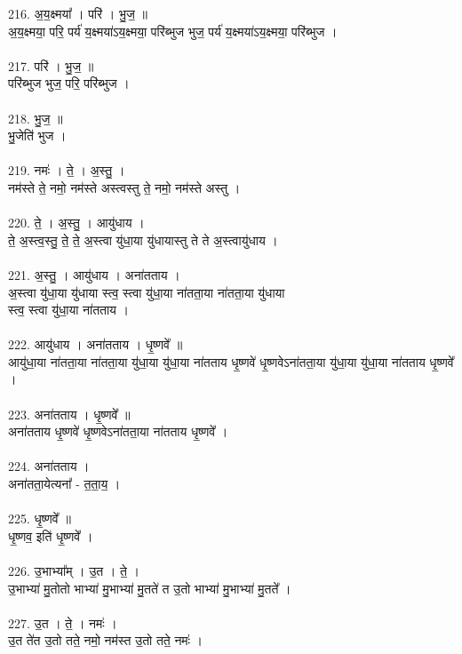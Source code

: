 216. अ॒य॒क्ष्मया᳚ । परि॑ । भु॒ज॒ ॥\\
अ॒य॒क्ष्मया॒ परि॒ पर्य॑ य॒क्ष्मया॑ऽय॒क्ष्मया॒ परि॑ब्भुज भुज॒ पर्य॑ य॒क्ष्मया॑ऽय॒क्ष्मया॒ परि॑ब्भुज ।\\
\\
217. परि॑ । भु॒ज॒ ॥\\
परि॑ब्भुज भुज॒ परि॒ परि॑ब्भुज ।\\
\\
218. भु॒ज॒ ॥\\
भु॒जेति॑ भुज ।\\
\\
219. नमः॑ । ते॒ । अ॒स्तु॒ ।\\
नम॑स्ते ते॒ नमो॒ नम॑स्ते अस्त्वस्तु ते॒ नमो॒ नम॑स्ते अस्तु ।\\
\\
220. ते॒ । अ॒स्तु॒ । आयु॑धाय ।\\
ते॒ अ॒स्त्व॒स्तु॒ ते॒ ते॒ अ॒स्त्वा यु॑धा॒या यु॑धायास्तु ते ते अ॒स्त्वायु॑धाय ।\\
\\
221. अ॒स्तु॒ । आयु॑धाय । अना॑तताय ।\\
अ॒स्त्वा यु॑धा॒या यु॑धाया स्त्व॒ स्त्वा यु॑धा॒या ना॑तता॒या ना॑तता॒या यु॑धाया\\
स्त्व॒ स्त्वा यु॑धा॒या ना॑तताय ।\\
\\
222. आयु॑धाय । अना॑तताय । धृ॒ष्णवे᳚ ॥\\
आयु॑धा॒या ना॑तता॒या ना॑तता॒या यु॑धा॒या यु॑धा॒या ना॑तताय धृ॒ष्णवे॑ धृ॒ष्णवेऽना॑तता॒या यु॑धा॒या यु॑धा॒या ना॑तताय धृ॒ष्णवे᳚ ।\\
\\
223. अना॑तताय । धृ॒ष्णवे᳚ ॥\\
अना॑तताय धृ॒ष्णवे॑ धृ॒ष्णवेऽना॑तता॒या ना॑तताय धृ॒ष्णवे᳚ ।\\
\\
224. अना॑तताय ।\\
अना॑तता॒येत्यना᳚ - त॒ता॒य॒ ।\\
\\
225. धृ॒ष्णवे᳚ ॥\\
धृ॒ष्णव॒ इति॑ धृ॒ष्णवे᳚ ।\\
\\
226. उ॒भाभ्या᳚म् । उ॒त । ते॒ ।\\
उ॒भाभ्या॑ मु॒तोतो भाभ्या॑ मु॒भाभ्या॑ मु॒तते॑ त उ॒तो भाभ्या॑ मु॒भाभ्या॑ मु॒तते᳚ ।\\
\\
227. उ॒त । ते॒ । नमः॑ ।\\
उ॒त ते॑त उ॒तो तते॒ नमो॒ नम॑स्त उ॒तो तते॒ नमः॑ ।\\
